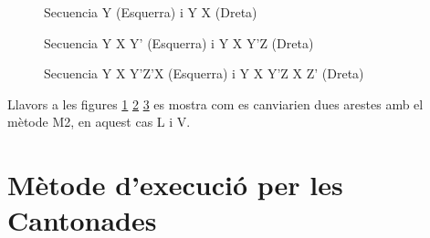 \begin{figure}[htbp]
    \centering
    \begin{subfigure}
        \centering\RubikCubeSolvedWY
    \end{subfigure}
    \begin{subfigure}
        \centering\RubikCubeSolvedWY
    \end{subfigure}
    \caption{Secuencia Y (Esquerra) i Y X (Dreta)}
    \label{fig:m2c-1}
\end{figure}

\begin{figure}[htbp]
    \centering
    \begin{subfigure}
        \centering\RubikCubeSolvedWY
    \end{subfigure}
    \begin{subfigure}
        \centering\RubikCubeSolvedWY
    \end{subfigure}
    \caption{Secuencia Y X Y' (Esquerra) i Y X Y'Z (Dreta)}
    \label{fig:m2c-2}
\end{figure}

\begin{figure}[h!]
    \centering
    \begin{subfigure}
        \centering\RubikCubeSolvedWY
    \end{subfigure}
    \begin{subfigure}
        \centering\RubikCubeSolvedWY
    \end{subfigure}
    \caption{Secuencia Y X Y'Z'X (Esquerra) i Y X Y'Z X Z' (Dreta)}
    \label{fig:m2c-3}
\end{figure}

Llavors a les figures \ref{fig:m2c-1} \ref{fig:m2c-2} \ref{fig:m2c-3} es mostra com es canviarien dues arestes amb el mètode M2, en aquest cas L i V.

\section{Mètode d'execució per les Cantonades}

